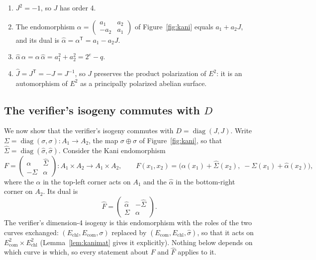\documentclass[version=preprint]{iacrcc}
\newcommand{\Ecom}{E_{\mathrm{com}}}
\newcommand{\Echl}{E_{\mathrm{chl}}}
\begin{document}
    \begin{lemma}
        \label{lem:J}
        \leavevmode
        \begin{enumerate}[label=(\roman*)]
            \item $J^2 = -1$, so $J$ has order 4.
            \item The endomorphism
            $\alpha = \left(\begin{smallmatrix} a_1 & a_2 \\ -a_2 & a_1
            \end{smallmatrix}\right)$ of Figure~\ref{fig:kani} equals
            $a_1 + a_2 J$, and its dual is
            $\widehat{\alpha} = \alpha^{\mathsf{T}} = a_1 - a_2 J$.
            \item $\widehat{\alpha}\,\alpha = \alpha\,\widehat{\alpha} = a_1^2 + a_2^2
            = 2^e - q$.
            \item $\widehat{J} = J^{\mathsf{T}} = -J = J^{-1}$, so $J$ preserves the
            product polarization of $E^2$: it is an automorphism of $E^2$ as a
            principally polarized abelian surface.
        \end{enumerate}
    \end{lemma}


    \subsection{The verifier's isogeny commutes with \texorpdfstring{$D$}{D}}
    \label{app:kani}

    We now show that the verifier's isogeny commutes with $D =
    \operatorname{diag}(J, J)$. Write $\Sigma = \operatorname{diag}(\sigma, \sigma) \colon A_1 \to A_2$, the
    map $\sigma \oplus \sigma$ of Figure~\ref{fig:kani}, so that
    $\widehat{\Sigma} = \operatorname{diag}(\widehat{\sigma},
    \widehat{\sigma})$. Consider the Kani endomorphism~\cite[Section 4]{DLRW24}
    \[
    F = \begin{pmatrix} \alpha & \widehat{\Sigma} \\
        -\Sigma & \widehat{\alpha} \end{pmatrix}
    \colon A_1 \times A_2 \longrightarrow A_1 \times A_2,
    \qquad
    F(x_1, x_2) = \bigl(\alpha(x_1) + \widehat{\Sigma}(x_2), \;
    -\Sigma(x_1) + \widehat{\alpha}(x_2)\bigr),
    \]
    where the $\alpha$ in the top-left corner acts on $A_1$ and the
    $\widehat{\alpha}$ in the bottom-right corner on $A_2$. Its dual is
    \[
    \widehat{F} = \begin{pmatrix} \widehat{\alpha} & -\widehat{\Sigma} \\
        \Sigma & \alpha \end{pmatrix}.
    \]
    The verifier's dimension-4 isogeny is this endomorphism with the roles of
    the two curves exchanged: $(\Echl, \Ecom, \sigma)$ replaced by $(\Ecom,
    \Echl, \widehat\sigma)$, so that it acts on $\Ecom^2 \times \Echl^2$
    (Lemma~\ref{lem:kanimat} gives it explicitly). Nothing below depends on
    which curve is which, so every statement about $F$ and $\widehat F$ applies
    to it.
\end{document}
